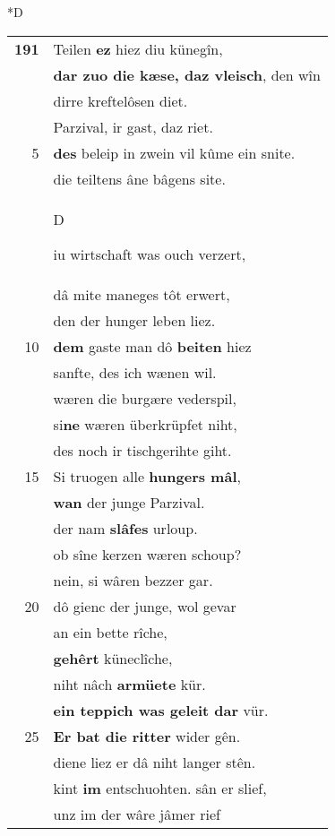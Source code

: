 \documentclass[8pt,a4paper,notitlepage]{article}
\begin{document}
\begin{table}[ht]
\begin{minipage}[t]{0.5\linewidth}
\small
\begin{center}*D
\end{center}
\begin{tabular}{rl}
\textbf{191} & Teilen \textbf{ez} hiez diu künegîn,\\ 
 & \textbf{dar zuo die kæse, daz vleisch}, den wîn\\ 
 & dirre kreftelôsen diet.\\ 
 & Parzival, ir gast, daz riet.\\ 
5 & \textbf{des} beleip in zwein vil kûme ein snite.\\ 
 & die teiltens âne bâgens site.\\ 
 & \begin{large}D\end{large}iu wirtschaft was ouch verzert,\\ 
 & dâ mite maneges tôt erwert,\\ 
 & den der hunger leben liez.\\ 
10 & \textbf{dem} gaste man dô \textbf{beiten} hiez\\ 
 & sanfte, des ich wænen wil.\\ 
 & wæren die burgære vederspil,\\ 
 & si\textbf{ne} wæren überkrüpfet niht,\\ 
 & des noch ir tischgerihte giht.\\ 
15 & Si truogen alle \textbf{hungers mâl},\\ 
 & \textbf{wan} der junge Parzival.\\ 
 & der nam \textbf{slâfes} urloup.\\ 
 & ob sîne kerzen wæren schoup?\\ 
 & nein, si wâren bezzer gar.\\ 
20 & dô gienc der junge, wol gevar\\ 
 & an ein bette rîche,\\ 
 & \textbf{gehêrt} küneclîche,\\ 
 & niht nâch \textbf{armüete} kür.\\ 
 & \textbf{ein teppich was geleit dar} vür.\\ 
25 & \textbf{Er bat die ritter} wider gên.\\ 
 & diene liez er dâ niht langer stên.\\ 
 & kint \textbf{im} entschuohten. sân er slief,\\ 
 & unz im der wâre jâmer rief\\ 

\end{tabular}
\end{minipage}
\end{table}
\end{document}
